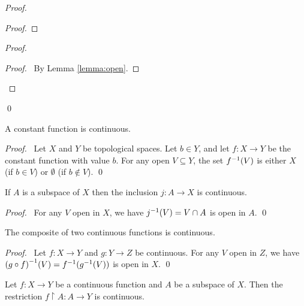 \begin{proof}
\begin{proof}
    \end{proof}
    \begin{proof}
        \qedstep
        \begin{proof}
            \pf\ By Lemma \ref{lemma:open}.
        \end{proof}
    \end{proof}
    \qed
\end{proof}

\begin{theorem}
    A constant function is continuous.
\end{theorem}

\begin{proof}
    \pf\ Let $X$ and $Y$ be topological spaces. Let $b \in Y$, and let $f : X \rightarrow Y$ be the constant
    function with value $b$. For any open $V \subseteq Y$, the set ${f}^{-1}(V)$ is either $X$ (if $b \in V$)
    or $\emptyset$ (if $b \notin V$). \qed
\end{proof}

\begin{theorem}
    If $A$ is a subspace of $X$ then the inclusion $j : A \rightarrow X$ is continuous.
\end{theorem}

\begin{proof}
    \pf\ For any $V$ open in $X$, we have ${j}^{-1}(V) = V \cap A$ is open in $A$. \qed
\end{proof}

\begin{theorem}
    \label{theorem:continuous_composite}
    The composite of two continuous functions is continuous.
\end{theorem}

\begin{proof}
    \pf\ Let $f : X \rightarrow Y$ and $g : Y \rightarrow Z$ be continuous. For any $V$ open in $Z$,
    we have ${(g \circ f)}^{-1}(V) = {f}^{-1}({g}^{-1}(V))$ is open in $X$. \qed
\end{proof}

\begin{theorem}
    \label{theorem:continuous_restriction}
    Let $f : X \rightarrow Y$ be a continuous function and $A$ be a subspace of $X$. Then the restriction
    $f \restriction A : A \rightarrow Y$ is continuous.
\end{theorem}

